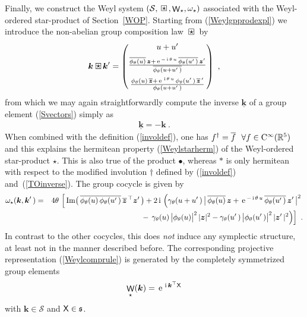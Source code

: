 \documentclass[11pt,a4paper]{article}
\DeclareMathOperator{\weyl}{{\sf W}}                   %
\newcommand{\compc}{\mkern+4mu\square\mkern-17.4mu{\mbox{
    \protect\raisebox{0.2ex}{$\star$}}\mkern+5mu}}      %
\newcommand{\ii}{{\rm i}}
\newcommand{\mbf}[1]{{\boldsymbol {#1} }}
\def\ii{{\,{\rm i}\,}}
\def\CC{{\rm C}}
\def\X{{\sf X}}
\def\mz{{\mbf z}}
\def\mk{{\mbf k}}
\def\mfs{{\mathfrak s}}
\def\mcS{{\mathcal S}}
\newcommand{\real}{{\mathbb R}} %
\def\e{{\,\rm e}\,}
\def\bea{\begin{eqnarray}}
\def\eea{\end{eqnarray}}
\newcommand{\beq}{\begin{eqnarray}}
\newcommand{\eeq}{\end{eqnarray}}
\begin{document}
Finally, we construct the Weyl system
$(\mcS,\compc,\weyl_\star,\omega_\star)$ associated with the
Weyl-ordered star-product of Section~\ref{WOP}. Starting from
(\ref{Weylgpprodexpl}) we introduce the non-abelian group composition
law $\compc$ by
\beq
\mk\compc\mk'=\begin{pmatrix}u+u'\,\\[2mm]
\frac{\overline{\phi_\theta(u)}\,{\mz}+
\e^{-\ii\theta\,u}\,\overline{\phi_\theta(u'\,)}\,\mz'}
{\overline{\phi_\theta(u+u'\,)}}\\[3mm]
\frac{\phi_\theta(u)\,\overline{\mz}+
\e^{\ii\theta\,u}\,\phi_\theta(u'\,)\,\overline{\mz}^{\,\prime}}
{\phi_\theta(u+u'\,)}\end{pmatrix} \ ,
\label{Weylcomplaw}\eeq
from which we may again straightforwardly compute the inverse
$\underline{\mk}$ of a group element (\ref{Svectors}) simply as
\beq
\underline{\mk}=-\mk \ .
\label{Weylinverse}\eeq
When combined with the definition (\ref{involdef}), one has
$f^\dag=\overline{f}~~\forall f\in\CC^\infty(\real^5)$ and this
explains the hermitean property (\ref{Weylstarherm}) of the
Weyl-ordered star-product $\star$. This is also true of the product
$\bullet$, whereas $*$ is only hermitean with respect to the modified
involution $\dag$ defined by (\ref{involdef})
and~(\ref{TOinverse}). The group cocycle is given by
\bea
\omega_\star(\mk,\mk'\,)&=&4\theta\,\left[\,{\rm Im}\bigl(\,
\overline{\phi_\theta(u)\,\phi_\theta(u'\,)}\,
\overline{\mz}^{\,\top}\mz'\,\bigr)+2\ii\left(\gamma_\theta(u+u'\,)
\,\bigl|\,\overline{\phi_\theta(u)}\,
\mz+\e^{-\ii\theta\,u}\,\overline{\phi_\theta(u'\,)}\,\mz'\,\bigr|^2
\right.\right.\nonumber\\&&\qquad\qquad\qquad\qquad-\left.\left.
\gamma_\theta(u)\,\bigl|\phi_\theta(u)\bigr|^2\,|\mz|^2-
\gamma_\theta(u'\,)\,\bigl|\phi_\theta(u'\,)\bigr|^2\,|\mz'\,|^2
\right)\right] \ .
\label{Weylcocycle}\eea
In contrast to the other cocycles, this does {\it not} induce any
symplectic structure, at least not in the manner described before. The
corresponding projective representation (\ref{Weylcomprule}) is
generated by the completely symmetrized group elements
\beq
\weyl_\star(\mk)=\e^{\ii\mk^\top\X}
\label{Weylweylop}\eeq
with $\mk\in\mcS$ and $\X\in\mfs$.
\end{document}
